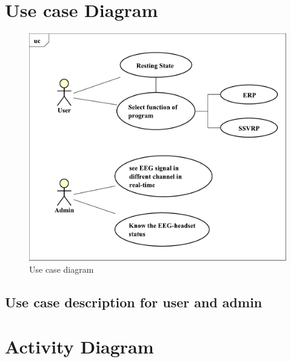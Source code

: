\section{Use case Diagram}
\begin{figure}[ht]
	\centering
	\includegraphics[scale = 0.5]{chapter4/uc.pdf}
	\caption{Use case diagram}
\end{figure}

\newpage

\subsection{Use case description for user and admin}

\section{Activity Diagram}
